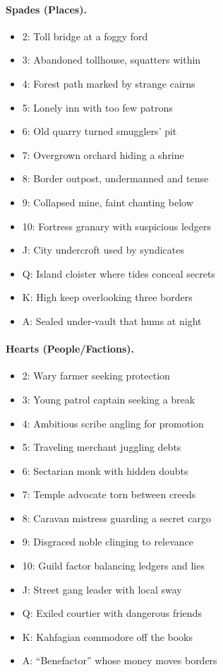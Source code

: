 \documentclass[12pt]{article}
\begin{document}
\paragraph{Spades (Places).}
\begin{itemize}
  \item 2: Toll bridge at a foggy ford
  \item 3: Abandoned tollhouse, squatters within
  \item 4: Forest path marked by strange cairns
  \item 5: Lonely inn with too few patrons
  \item 6: Old quarry turned smugglers’ pit
  \item 7: Overgrown orchard hiding a shrine
  \item 8: Border outpost, undermanned and tense
  \item 9: Collapsed mine, faint chanting below
  \item 10: Fortress granary with suspicious ledgers
  \item J: City undercroft used by syndicates
  \item Q: Island cloister where tides conceal secrets
  \item K: High keep overlooking three borders
  \item A: Sealed under-vault that hums at night
\end{itemize}

\paragraph{Hearts (People/Factions).}
\begin{itemize}
  \item 2: Wary farmer seeking protection
  \item 3: Young patrol captain seeking a break
  \item 4: Ambitious scribe angling for promotion
  \item 5: Traveling merchant juggling debts
  \item 6: Sectarian monk with hidden doubts
  \item 7: Temple advocate torn between creeds
  \item 8: Caravan mistress guarding a secret cargo
  \item 9: Disgraced noble clinging to relevance
  \item 10: Guild factor balancing ledgers and lies
  \item J: Street gang leader with local sway
  \item Q: Exiled courtier with dangerous friends
  \item K: Kahfagian commodore off the books
  \item A: ``Benefactor'' whose money moves borders
\end{itemize}
\end{document}
